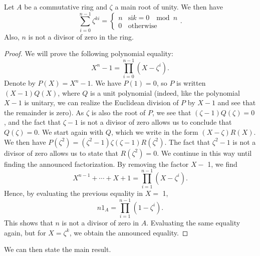 \begin{lem}
\label{lem-transf-fourier-ring}
Let $ A $ be a commutative ring and $ \zeta $ a main  root of unity. We then have
\begin{equation*}
\sum_{i = 0}^{n-1}{\zeta^{ki}} = \left\{\begin{array}{ll} n & \text{si} k = 0 \; \mod{n} \\0 & \text{otherwise} \end{array} \right. .
\end{equation*}
 Also, $ n $ is not a divisor of zero in the ring.
\end{lem}
\begin{proof}
We will prove the following polynomial equality:
\begin{equation*}
X^n - 1 = \prod_{i = 0}^{n-1}{\left(X- \zeta^i \right)}.
\end{equation*}
Denote by $ P (X) = X^n - 1 $. We have $ P (1) = 0 $, so $ P $ is written $ (X - 1) Q (X) $, where $ Q $ is a unit polynomial (indeed, like the polynomial $ X-1 $ is unitary, we can realize the Euclidean division of $ P $ by $ X-1 $ and see that the remainder is zero). As $ \zeta $ is also the root of $ P $, we see that $ (\zeta - 1) Q (\zeta) = 0 $, and the fact that $ \zeta - 1 $ is not a divisor of zero allows us to conclude that $ Q (\zeta) = 0 $. We start again with $ Q $, which we write in the form $ (X - \zeta) R (X) $. We then have $ P (\zeta^2) = (\zeta^2-1) \zeta (\zeta - 1) R (\zeta^2) $. The fact that $ \zeta^2 - 1 $ is not a divisor of zero allows us to state that $ R (\zeta^2) = 0 $. We continue in this way until finding the announced factorization. By removing the factor $ X - $ 1, we find
\begin{equation*}
X^{n-1} + \cdots + X + 1 = \prod_{i = 1}^{n-1}{\left(X- \zeta^i \right)}.
\end{equation*}
Hence, by evaluating the previous equality in $ X = $ 1,
\begin{equation*}
n 1_A = \prod_{i = 1}^{n-1}{\left(1- \zeta^i \right)}.
\end{equation*}
This shows that $ n $ is not a divisor of zero in $ A $. Evaluating the same equality again, but for $ X = \zeta^k $, we obtain the announced equality.
\end{proof}
We can then state the main result.
 
